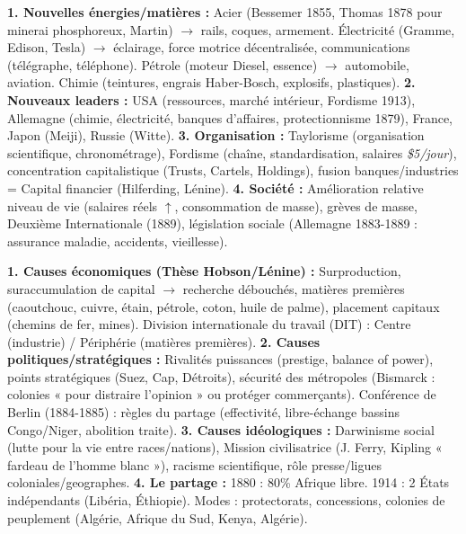 \documentclass[11pt]{article}
\newcommand{\cle}[1]{{\popxbold\color{popdark}#1}}
\begin{document}
\begin{aretenir}
\textbf{1. Nouvelles énergies/matières :} \cle{Acier} (Bessemer 1855, Thomas 1878 pour minerai phosphoreux, Martin) $\rightarrow$ rails, coques, armement. \cle{Électricité} (Gramme, Edison, Tesla) $\rightarrow$ éclairage, force motrice décentralisée, communications (télégraphe, téléphone). \cle{Pétrole} (moteur Diesel, essence) $\rightarrow$ automobile, aviation. \cle{Chimie} (teintures, engrais Haber-Bosch, explosifs, plastiques).
\textbf{2. Nouveaux leaders :} \cle{USA} (ressources, marché intérieur, Fordisme 1913), \cle{Allemagne} (chimie, électricité, banques d'affaires, protectionnisme 1879), France, Japon (Meiji), Russie (Witte).
\textbf{3. Organisation :} \cle{Taylorisme} (organisation scientifique, chronométrage), \cle{Fordisme} (chaîne, standardisation, salaires \emph{\$5/jour}), concentration capitalistique (\cle{Trusts}, \cle{Cartels}, \cle{Holdings}), fusion banques/industries = \cle{Capital financier} (Hilferding, Lénine).
\textbf{4. Société :} Amélioration relative niveau de vie (salaires réels $\uparrow$, consommation de masse), grèves de masse, \cle{Deuxième Internationale} (1889), législation sociale (Allemagne 1883-1889 : assurance maladie, accidents, vieillesse).
\end{aretenir}

\begin{aretenir}
\textbf{1. Causes économiques (Thèse Hobson/Lénine) :} Surproduction, suraccumulation de capital $\rightarrow$ recherche \cle{débouchés}, \cle{matières premières} (caoutchouc, cuivre, étain, pétrole, coton, huile de palme), placement capitaux (chemins de fer, mines). \cle{Division internationale du travail (DIT)} : Centre (industrie) / Périphérie (matières premières).
\textbf{2. Causes politiques/stratégiques :} Rivalités puissances (prestige, \cle{balance of power}), points stratégiques (Suez, Cap, Détroits), sécurité des métropoles (Bismarck : colonies « pour distraire l'opinion » ou protéger commerçants). \cle{Conférence de Berlin} (1884-1885) : règles du partage (effectivité, libre-échange bassins Congo/Niger, abolition traite).
\textbf{3. Causes idéologiques :} \cle{Darwinisme social} (lutte pour la vie entre races/nations), \cle{Mission civilisatrice} (J. Ferry, Kipling « fardeau de l'homme blanc »), racisme scientifique, rôle presse/ligues coloniales/geographes.
\textbf{4. Le partage :} 1880 : 80\% Afrique libre. 1914 : 2 États indépendants (Libéria, Éthiopie). Modes : protectorats, concessions, colonies de peuplement (Algérie, Afrique du Sud, Kenya, Algérie).
\end{aretenir}
\end{document}

